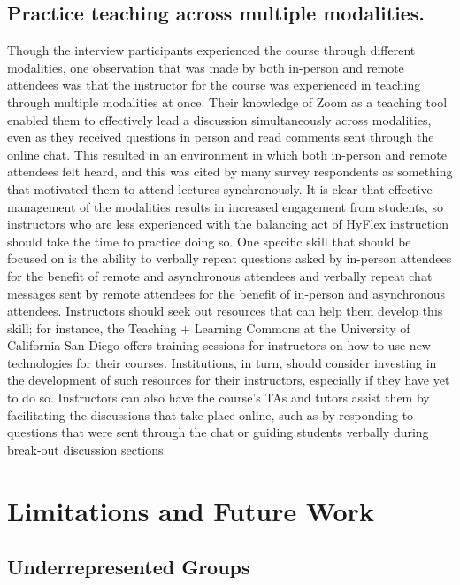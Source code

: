 \subsection{Practice teaching across multiple modalities.}

Though the interview participants experienced the course through different modalities, one observation that was made by both in-person and remote attendees was that the instructor for the course was experienced in teaching through multiple modalities at once. Their knowledge of Zoom as a teaching tool enabled them to effectively lead a discussion simultaneously across modalities, even as they received questions in person and read comments sent through the online chat. This resulted in an environment in which both in-person and remote attendees felt heard, and this was cited by many survey respondents as something that motivated them to attend lectures synchronously. It is clear that effective management of the modalities results in increased engagement from students, so instructors who are less experienced with the balancing act of HyFlex instruction should take the time to practice doing so. One specific skill that should be focused on is the ability to verbally repeat questions asked by in-person attendees for the benefit of remote and asynchronous attendees and verbally repeat chat messages sent by remote attendees for the benefit of in-person and asynchronous attendees. Instructors should seek out resources that can help them develop this skill; for instance, the Teaching + Learning Commons at the University of California San Diego offers training sessions for instructors on how to use new technologies for their courses. Institutions, in turn, should consider investing in the development of such resources for their instructors, especially if they have yet to do so. Instructors can also have the course's TAs and tutors assist them by facilitating the discussions that take place online, such as by responding to questions that were sent through the chat or guiding students verbally during break-out discussion sections.

\section{Limitations and Future Work}

\subsection{Underrepresented Groups}


